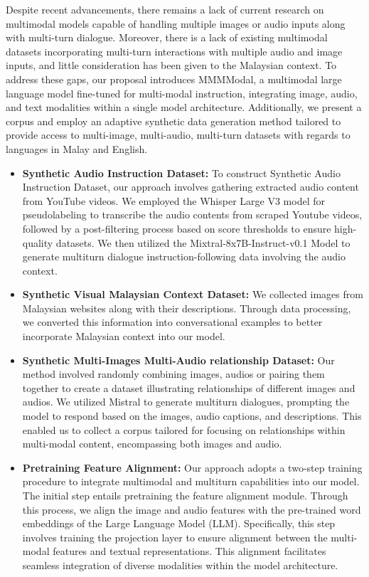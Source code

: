 \documentclass[preprint]{article}
\begin{document}
Despite recent advancements, there remains a lack of current research on multimodal models capable of handling multiple images or audio inputs along with multi-turn dialogue. Moreover, there is a lack of existing multimodal datasets incorporating multi-turn interactions with multiple audio and image inputs, and little consideration has been given to the Malaysian context. To address these gaps, our proposal introduces MMMModal, a multimodal large language model fine-tuned for multi-modal instruction, integrating image, audio, and text modalities within a single model architecture. Additionally, we present a corpus and employ an adaptive synthetic data generation method tailored to provide access to multi-image, multi-audio, multi-turn datasets with regards to languages in Malay and English.

\begin{itemize}

  \item \textbf{Synthetic Audio Instruction Dataset:}
        To construct Synthetic Audio Instruction Dataset, our approach involves gathering extracted audio content from YouTube videos. We  employed the Whisper Large V3 model for pseudolabeling to transcribe the audio contents from scraped Youtube videos, followed by a post-filtering process based on score thresholds to ensure high-quality datasets. We then utilized the Mixtral-8x7B-Instruct-v0.1 Model to generate multiturn dialogue instruction-following data involving the audio context.

  \item \textbf{Synthetic Visual Malaysian Context Dataset:}  We collected images from Malaysian websites along with their descriptions. Through data processing, we converted this information into conversational examples to better incorporate Malaysian context into our model.

  \item \textbf{Synthetic Multi-Images Multi-Audio relationship Dataset:} Our method involved randomly combining images, audios or pairing them together to create a dataset illustrating relationships of different images and audios. We utilized Mistral to generate multiturn dialogues, prompting the model to respond based on the images, audio captions, and descriptions. This enabled us to collect a corpus tailored for focusing on relationships within multi-modal content, encompassing both images and audio.

  \item \textbf{Pretraining Feature Alignment:} Our approach adopts a two-step training procedure to integrate multimodal and multiturn capabilities into our model. The initial step entails pretraining the feature alignment module. Through this process, we align the image and audio features with the pre-trained word embeddings of the Large Language Model (LLM). Specifically, this step involves training the projection layer to ensure alignment between the multi-modal features and textual representations. This alignment facilitates seamless integration of diverse modalities within the model architecture.


\end{itemize}
\end{document}
